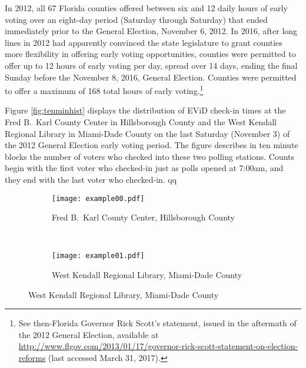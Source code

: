 \documentclass[12pt,titlepage]{article}
\begin{document}






In 2012, all 67 Florida counties offered between six and 12 daily
hours of early voting over an eight-day period (Saturday through
Saturday) that ended immediately prior to the General Election,
November 6, 2012.  In 2016, after long lines in 2012 had apparently
convinced the state legislature to grant counties more flexibility in
offering early voting opportunities, counties were permitted to offer
up to 12 hours of early voting per day, spread over 14 days, ending
the final Sunday before the November 8, 2016, General Election.
Counties were permitted to offer a maximum of 168 total hours of early
voting.\footnote{See then-Florida Governor Rick Scott's statement,
  issued in the aftermath of the 2012 General Election, available at
  \url{http://www.flgov.com/2013/01/17/governor-rick-scott-statement-on-election-reforms}
  (last accessed March 31, 2017).}

Figure \ref{fig:tenminhist} displays the distribution of EViD check-in
times at the Fred B.\ Karl County Center in Hillsborough County and
the West Kendall Regional Library in Miami-Dade County on the last
Saturday (November 3) of the 2012 General Election early voting
period. The figure describes in ten minute blocks the number of voters
who checked into these two polling stations. Counts begin with the
first voter who checked-in just as polls opened at 7:00am, and they
end with the last voter who checked-in.
qq
\begin{figure}[!ht]
  \caption{Early voting check-in times on Saturday, November 3, 2012,
    in two locations}
  \label{fig:tenminhist}
  \centering
  \begin{subfigure}[b]{\linewidth}
    \centering\texttt{[image: example00.pdf]}
    \caption{Fred B.\ Karl County Center, Hillsborough County}
    \label{fig:karlexample}
  \end{subfigure}%
  \\
  \begin{subfigure}[b]{\linewidth}
    \centering\texttt{[image: example01.pdf]}
    \caption{West Kendall Regional Library, Miami-Dade County}
    \label{fig:kendallexample}
  \end{subfigure}
\end{figure}
\end{document}
